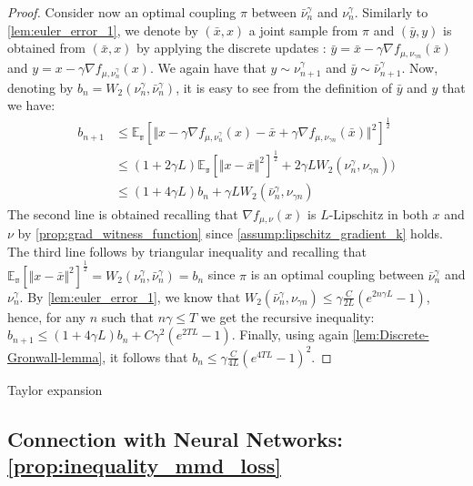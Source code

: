\begin{proof}
Consider now an optimal coupling $\pi$ between $\bar{\nu}_{n}^{\gamma}$
and $\nu_{n}^{\gamma}$. Similarly to \cref{lem:euler_error_1}, we
denote by $(\bar{x},x)$ a joint sample from $\pi$ and $(\bar{y},y)$
is obtained from $(\bar{x},x)$  by applying the discrete updates  : $\bar{y}=\bar{x}-\gamma\nabla f_{\mu,\nu_{\gamma n}}(\bar{x})$ and $y=x-\gamma\nabla f_{\mu,\nu_{n}^{\gamma}}(x)$. We again have that $y\sim\nu_{n+1}^{\gamma}$ and $\bar{y}\sim\bar{\nu}_{n+1}^{\gamma}$.
Now, denoting by $b_{n}=W_{2}(\nu_{n}^{\gamma},\bar{\nu}_{n}^{\gamma})$, it is easy to see from the definition of $\bar{y}$ and $y$ that
we have:
\begin{align*}
b_{n+1} & \leq\mathbb{E_{\pi}}\left[\Vert x-\gamma\nabla f_{\mu,\nu_{n}^{\gamma}}(x)-\bar{x}+\gamma\nabla f_{\mu,\nu_{\gamma n}}(\bar{x})\Vert^{2}\right]^{\frac{1}{2}}\\
&\leq (1+2\gamma L)  \mathbb{E_{\pi}}\left[\Vert x-\bar{x}\Vert^2\right]^{\frac{1}{2}} + 2\gamma L W_2(\nu_n^{\gamma},\nu_{\gamma n}))\\
 & \leq (1+ 4\gamma L)b_n + \gamma L W_2(\bar{\nu}_n^{\gamma},\nu_{\gamma n})
\end{align*}
The second line is obtained recalling that $\nabla f_{\mu,\nu}(x)$ is $L$-Lipschitz in both $x$
and $\nu$ by \cref{prop:grad_witness_function} since \cref{assump:lipschitz_gradient_k} holds. The third line follows by triangular inequality and recalling that $\mathbb{E_{\pi}}\left[\Vert x-\bar{x}\Vert^2\right]^{\frac{1}{2}}= W_2(\nu_n^{\gamma},\bar{\nu}_n^{\gamma}) = b_n$ since $\pi$ is an optimal coupling between $\bar{\nu}_{n}^{\gamma}$
and $\nu_{n}^{\gamma}$. 
By \cref{lem:euler_error_1}, we know that $W_2(\bar{\nu}_n^{\gamma},\nu_{\gamma n})\leq\gamma\frac{C}{2L}(e^{2n\gamma L}-1)$, hence, for any $n$ such that $n\gamma\leq T$ we get the recursive inequality: $b_{n+1}\leq(1+4\gamma L)b_{n}+C\gamma^{2}(e^{2TL}-1)$. Finally, using again \cref{lem:Discrete-Gronwall-lemma}, it follows that $b_{n}\leq\gamma\frac{C}{4L}(e^{4TL}-1)^{2}$.
\end{proof}
%

\begin{lemma}
\label{lem:Taylor-expansion}Taylor expansion
\end{lemma}



\subsection{Connection with Neural Networks: \cref{prop:inequality_mmd_loss}}

